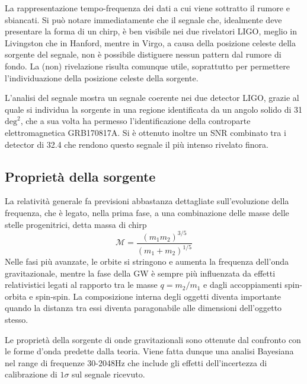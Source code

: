 La rappresentazione tempo-frequenza dei dati a cui viene sottratto il rumore e sbiancati. Si può notare immediatamente che il segnale che, idealmente deve presentare la forma di un chirp, è ben visibile nei due rivelatori LIGO, meglio in Livingston che in Hanford, mentre in Virgo, a causa della posizione celeste della sorgente del segnale, non è possibile distiguere nessun pattern dal rumore di fondo. La (non) rivelazione risulta comunque utile, soprattutto per permettere l'individuazione della posizione celeste della sorgente.

L'analisi del segnale mostra un segnale coerente nei due detector LIGO, grazie al quale si individua la sorgente in una regione identificata da un angolo solido di 31 $\text{deg}^2$, che a sua volta ha permesso l'identificazione della controparte elettromagnetica GRB170817A. 
Si è ottenuto inoltre un SNR combinato tra i detector di 32.4 che rendono questo segnale il più intenso rivelato finora.\cite{Abbott_2017b}

\subsection{Proprietà della sorgente}
\label{subsection:proprietàSorgGW170817}
La relatività generale fa previsioni abbastanza dettagliate sull'evoluzione della frequenza, che è legato, nella prima fase, a una combinazione delle masse delle stelle progenitrici, detta massa di chirp 
\begin{equation}
	\mathcal{M} = \frac{(m_1m_2)^{3/5}}{(m_1+m_2)^{1/5}}
	\label{eqn:chirpmass}
\end{equation}
Nelle fasi più avanzate, le orbite si stringono e aumenta la frequenza dell'onda gravitazionale, mentre la fase della GW è sempre più influenzata da effetti relativistici legati al rapporto tra le masse $q = m_2/m_1$ e dagli accoppiamenti spin-orbita e spin-spin. 
La composizione interna degli oggetti diventa importante quando la distanza tra essi diventa paragonabile alle dimensioni dell'oggetto stesso. 

Le proprietà della sorgente di onde gravitazionali sono ottenute dal confronto con le forme d'onda predette dalla teoria. Viene fatta dunque una analisi Bayesiana nel range di frequenze 30-2048Hz che include gli effetti dell'incertezza di calibrazione di $1\sigma$ sul segnale ricevuto.

